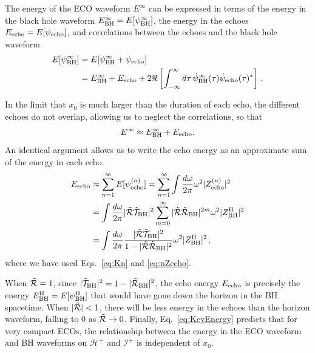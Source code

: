 \begin{refsection}
The energy of the ECO waveform $E^\infty$ can be expressed in terms of the energy in the black hole waveform  $E_{\rm BH}^\infty=E[\psi_{\rm BH}^\infty]$, the energy in the echoes $E_{\rm echo}=E[\psi_{\rm echo}]$, and correlations between the echoes and the black hole waveform
\begin{align}
 E[\psi_{\rm BH}^\infty]&=E[\psi_{\rm BH}^\infty +\psi_{\rm echo}] \nonumber \\ 
 &= E_{\rm BH}^\infty + E_{\rm echo}
+2\Re
\left[\int_{-\infty}^\infty d\tau \, \dot \psi_{\rm BH}^\infty(\tau)\dot \psi_{\rm echo}(\tau)^*\right] \,.
\end{align}

In the limit that $x_0$ is much larger than the duration of each echo, the different echoes do not overlap, allowing us to neglect the correlations, so that
\begin{align}
 E^\infty \approx E_{\rm BH}^\infty + E_{\rm echo} \label{Eq:ennocor}.
\end{align}
An identical argument allows us to write the echo energy as an approximate sum of the energy in each echo. 
\begin{align}
E_{\rm echo}& \approx \sum_{n=1}^\infty E[\psi_{\rm echo}^{(n)}] 
= \sum_{n=1}^\infty \int \frac{d\omega}{2\pi}\omega^2|Z_{\rm echo}^{(n)}|^2
\nonumber \\
&= \int\frac{d\omega}{2\pi}|\tilde{\mathcal R} \tilde{\mathcal T}_{\rm BH}|^2\sum_{m=0}^\infty |\tilde{\mathcal R}\tilde{\mathcal R}_{\rm BH}|^{2m}\omega^2|Z^{\rm H}_{\rm BH}|^2
\nonumber \\
&= \int \frac{d\omega}{2\pi}\frac{|\tilde{\mathcal R}\tilde{\mathcal T}_{\rm BH}|^2}{1-|\tilde{\mathcal R} \tilde{\mathcal R}_{\rm BH}|^2}\omega^2 |Z^{\rm H}_{\rm BH}|^2 \,,
\label{eq:KeyEnergy}
\end{align}
where we have used Eqs.~\eqref{eq:Kn} and \eqref{eq:nZecho}.

When $\tilde{\mathcal R} =1$, since $|\tilde{\mathcal T}_{\rm BH}|^2=1-|\tilde{\mathcal R}_{\rm BH}|^2$, the echo energy $E_{\rm echo}$ is precisely the energy $E_{\rm BH}^{\rm H}=E[\psi_{\rm BH}^{\rm H}]$ that would have gone down the horizon in the BH spacetime. 
When $|\tilde{\mathcal R}|<1$, there will be less energy in the echoes than the horizon waveform, falling to $0$ as $\tilde{\mathcal R} \to 0$. 
Finally, Eq.~\eqref{eq:KeyEnergy} predicts that for very compact ECOs, the relationship between the energy in the ECO waveform and BH waveforms on $\mathcal{H}^+$ and $\mathcal{I}^+$ is independent of $x_0$.


\end{refsection}
